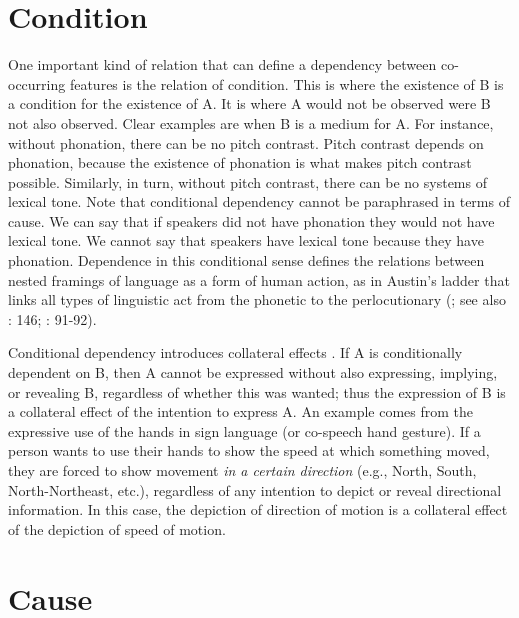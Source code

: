 \documentclass[output=paper]{langsci/langscibook}
\begin{document}
\section{Condition}

One important kind of relation that can define a dependency between co-occur\-ring features is the relation of condition. This is where the existence of B is a condition for the existence of A. It is where A would not be observed were B not also observed. Clear examples are when B is a medium for A. For instance, without phonation, there can be no pitch contrast. Pitch contrast depends on phonation, because the existence of phonation is what makes pitch contrast possible. Similarly, in turn, without pitch contrast, there can be no systems of lexical tone. Note that conditional dependency cannot be paraphrased in terms of cause.    We can say that if  speakers did not have phonation they would not have lexical tone. We cannot say that  speakers have lexical tone because they have phonation. Dependence in this conditional sense defines the relations between nested framings of language as a form of human action, as in Austin’s ladder  that links all types of linguistic act from the phonetic to the perlocutionary (\citealt{Austin1962}; see also \citeauthor{Clark1996} \citeyear{Clark1996}: 146; \citeauthor{Enfield2013agencyenchrony} \citeyear{Enfield2013agencyenchrony}: 91-92).

Conditional dependency introduces collateral effects \citep{Sidnell2012collateral}. If A is conditionally dependent on B, then A cannot be expressed without also expressing, implying, or revealing B, regardless of whether this was wanted; thus the expression of B is a collateral effect of the intention to express A. An example comes from the expressive use of the hands  in sign language (or co-speech hand gesture). If a person wants to use their hands to show the speed at which something moved, they are forced to show movement \textit{in a certain direction} (e.g., North, South, North-Northeast, etc.), regardless of any intention to depict  or reveal directional information. In this case, the depiction of direction of motion is a collateral effect of the depiction of speed of motion. 

\section{Cause}
\end{document}
